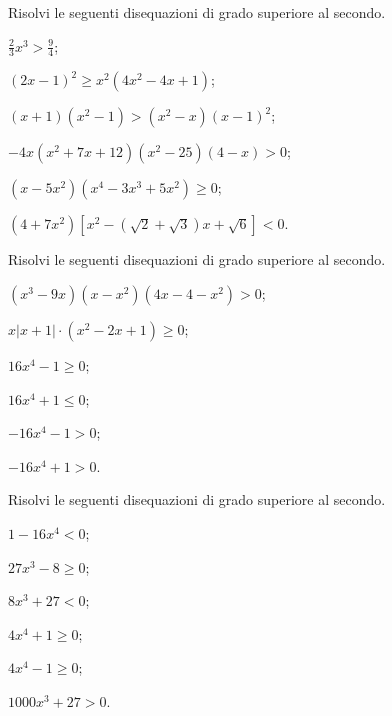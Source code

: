 \begin{esercizio}
 \label{ese:4.54}
Risolvi le seguenti disequazioni di grado superiore al secondo.
\begin{enumeratea}
\item $\frac 2 3x^3>\frac 9 4$;
\item $ (2x-1)^2\ge x^2\left(4x^2-4x+1\right) $;
\item $ (x+1)\left(x^2-1\right)>\left(x^2-x\right)(x-1)^2 $;
\item $ -4x\left(x^2+7x+12\right)\left(x^2-25\right)(4-x)>0 $;
\item $ (x-5x^2)(x^4-3x^3+5x^2)\ge 0 $;
\item $ (4+7x^2)\left[x^2-(\sqrt 2+\sqrt 3)x+\sqrt 6\right]<0 $.
\end{enumeratea}
\end{esercizio}
\newpage
\begin{esercizio}
 \label{ese:4.55}
Risolvi le seguenti disequazioni di grado superiore al secondo.
\begin{multicols}{2}
\begin{enumeratea}
\item $ (x^3-9x)(x-x^2)(4x-4-x^2)>0 $;
\item $ x\left|x+1\right|\cdot (x^2-2x+1)\ge 0 $;
\item $16x^4-1\ge 0$;
\item $16x^4+1\le 0$;
\item $-16x^4-1>0$;
\item $-16x^4+1>0$.
\end{enumeratea}
\end{multicols}
\end{esercizio}

\begin{esercizio}
 \label{ese:4.56}
Risolvi le seguenti disequazioni di grado superiore al secondo.
\begin{multicols}{3}
\begin{enumeratea}
\item $1-16x^4<0$;
\item $27x^3-8\ge 0$;
\item $8x^3+27<0$;
\item $4x^4+1\ge 0$;
\item $4x^4-1\ge 0$;
\item $1000x^3+27>0$.
\end{enumeratea}
\end{multicols}
\end{esercizio}

